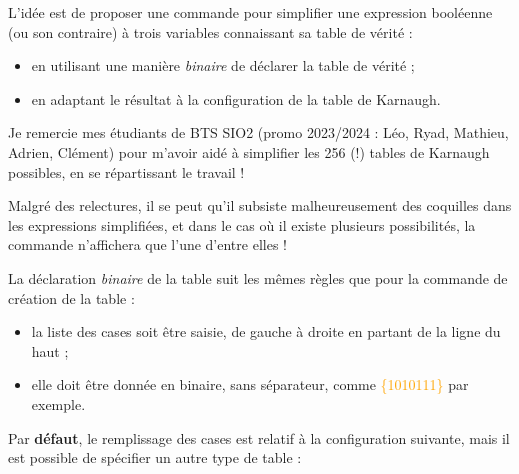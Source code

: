 \documentclass[french,a4paper,11pt]{article}
\newcommand\Cle[1]{{\small\sffamily\textlangle \textcolor{orange}{#1}\textrangle}}
\begin{document}
{{\begin{cautionblock}
L'idée est de proposer une commande pour simplifier une expression booléenne (ou son contraire) à trois variables connaissant sa table de vérité :

\begin{itemize}
	\item en utilisant une manière \textit{binaire} de déclarer la table de vérité ;
	\item en adaptant le résultat à la configuration de la table de Karnaugh.
\end{itemize}
\vspace*{-\baselineskip}\leavevmode
\end{cautionblock}

\begin{importantblock}
Je remercie mes étudiants de BTS SIO2 (promo 2023/2024 : Léo, Ryad, Mathieu, Adrien, Clément) pour m'avoir aidé à simplifier les 256 (!) tables de Karnaugh possibles, en se répartissant le travail !

\smallskip

Malgré des relectures, il se peut qu'il subsiste malheureusement des coquilles dans les expressions simplifiées, et dans le cas où il existe plusieurs possibilités, la commande n'affichera que l'une d'entre elles !
\end{importantblock}

\begin{DemoCode}
\end{DemoCode}

\begin{cautionblock}
La déclaration \textit{binaire} de la table suit les mêmes règles que pour la commande de création de la table :

\begin{itemize}
	\item la liste des cases soit être saisie, de gauche à droite en partant de la ligne du haut ;
	\item elle doit être donnée en binaire, sans séparateur, comme \Cle{\{1010111\}} par exemple.
\end{itemize}
\vspace*{-\baselineskip}\leavevmode
\end{cautionblock}

\begin{importantblock}
Par \textbf{défaut}, le remplissage des cases est relatif à la configuration suivante, mais il est possible de spécifier un autre type de table :


\end{importantblock}}}
\end{document}
